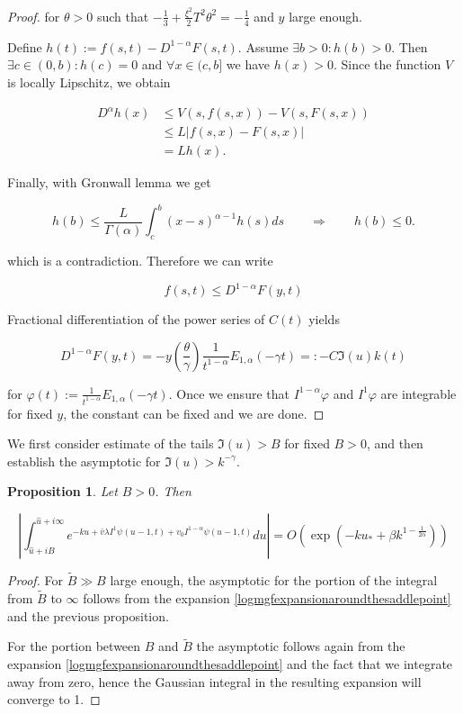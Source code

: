 \documentclass[12pt]{article}
\theoremstyle{plain}
\newtheorem{proposition}{Proposition}[section]
\begin{document}
\begin{proof}
for $\theta>0$ such that $-\frac{1}{3}+\frac{\xi^{2}}{2} T^{2} \theta^{2}=-\frac{1}{4}$ and $y$ large enough.

Define $h(t) := f(s,t) - D^{1-\alpha} F(s,t)$. Assume $\exists b > 0:h(b)>0$. Then $\exists c\in(0,b) : h(c)=0$ and  $\forall x \in (c,b]$ we have $h(x)>0$. Since the function $V$ is locally Lipschitz, we obtain

$$
\begin{aligned}
D^\alpha h(x) & \leq V(s, f(s,x)) - V(s, F(s,x))\\[5pt]
&\leq L|f(s,x)-F(s,x)|\\[5pt]
&=Lh(x).
\end{aligned}
$$

Finally, with Gronwall lemma we get

$$
h(b)\leq \frac{L}{\Gamma(\alpha)}\int _c^b(x-s)^{\alpha-1}h(s)ds\qquad \Rightarrow \qquad h(b) \leq 0.
$$

which is a contradiction. Therefore we can write

$$
f(s, t)\leq D^{1-\alpha} F(y,t)
$$

Fractional differentiation of the power series of $C(t)$ yields

$$
D^{1-\alpha}F(y, t) = -y\left(\frac \theta \gamma\right) \frac{1}{t^{1-\alpha}} E_{1,\alpha}(-\gamma t)=:-C \Im(u) k(t)
$$

for $\varphi(t):=\frac{1}{t^{1-\alpha}} E_{1,\alpha}(-\gamma t)$. Once we ensure that $I^{1-\alpha}\varphi$ and $I^1\varphi$ are integrable for fixed $y$, the constant can be fixed and we are done.

\end{proof}

We first consider estimate of the tails $\Im (u) > B$ for fixed $B>0$, and then establish the asymptotic for $\Im (u) > k^{-\gamma}$.

\begin{proposition}

Let $B>0$. Then

$$
\left|\int_{\hat{u}+i B}^{\hat{u}+i \infty} e^{-ku+\bar{v} \lambda I^{1} \psi(u-1, t)+v_{0} I^{1-\alpha} \psi(u-1, t)} d u\right|=O\left(\exp \left(-ku_* +\beta k^{1 -\frac{1}{2\alpha}}\right)\right)
$$

\end{proposition}

\begin{proof}
For $\tilde B \gg B$ large enough, the asymptotic for the portion of the integral from $\tilde B$ to $\infty$ follows from the expansion \eqref{logmgfexpansionaroundthesaddlepoint} and the previous proposition.

For the portion between $B$ and $\tilde B$ the asymptotic follows again from the expansion \eqref{logmgfexpansionaroundthesaddlepoint} and the fact that we integrate away from zero, hence the Gaussian integral in the resulting expansion will converge to 1.
\end{proof}
\end{document}
